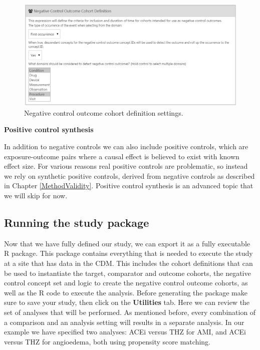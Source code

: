 \documentclass[]{book}
\begin{document}
\begin{figure}

{\centering \includegraphics[width=1\linewidth]{images/PopulationLevelEstimation/ncSettings} 

}

\caption{Negative control outcome cohort definition settings.}\label{fig:ncSettings}
\end{figure}

\textbf{Positive control synthesis}

In addition to negative controls we can also include positive controls,
which are exposure-outcome pairs where a causal effect is believed to
exist with known effect size. For various reasons real positive controls
are problematic, so instead we rely on synthetic positive controls,
derived from negative controls as described in Chapter
\ref{MethodValidity}. Positive control synthesis is an advanced topic
that we will skip for now.

\subsection{Running the study package}\label{running-the-study-package}

Now that we have fully defined our study, we can export it as a fully
executable R package. This package contains everything that is needed to
execute the study at a site that has data in the CDM. This includes the
cohort definitions that can be used to instantiate the target,
comparator and outcome cohorts, the negative control concept set and
logic to create the negative control outcome cohorts, as well as the R
code to execute the analysis. Before generating the package make sure to
save your study, then click on the \textbf{Utilities} tab. Here we can
review the set of analyses that will be performed. As mentioned before,
every combination of a comparison and an analysis setting will results
in a separate analysis. In our example we have specified two analyses:
ACEi versus THZ for AMI, and ACEi versus THZ for angioedema, both using
propensity score matching.
\end{document}
